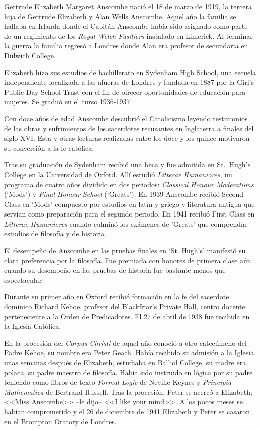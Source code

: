 Gertrude Elizabeth Margaret Anscombe nació el 18 de marzo de 1919, la tercera
hija de Gertrude Elizabeth y Alan Wells Anscombe. Aquel año la familia se
hallaba en Irlanda donde el Capitán Anscombe había sido asignado como parte de
un regimiento de los \emph{Royal Welch Fusiliers} instalado en Limerick. Al
terminar la guerra la familia regresó a Londres donde Alan era profesor de
secundaria en Dulwich College.\autocite[cf.~][p.~31]{teichman2002fellows}

Elizabeth hizo sus estudios de bachillerato en Sydenham High School, una escuela
independiente localizada a las afueras de Londres y fundada en 1887 por la
Girl's Public Day School Trust con el fin de ofrecer oportunidades de educación
para mujeres. Se graduó en el curso 1936-1937.

Con doce años de edad Anscombe descubrió el Catolicismo leyendo testimonios de
las obras y sufrimientos de los sacerdotes recusantes en Inglaterra a finales
del siglo XVI. Esta y otras lecturas realizadas entre los doce y los quince
motivaron su conversión a la fe
católica.\autocite[cf.~][p.~33]{teichman2002fellows}

Tras su graduación de Sydenham recibió una beca y fue admitida en St.~Hugh's
College en la Universidad de Oxford. Allí estudió \emph{Litterae Humaniores}, un
programa de cuatro años dividido en dos periodos: \emph{Classical Honour
  Moderations} (`Mods') y \emph{Final Honour School} (`Greats'). En 1939
Anscombe recibió Second Class en `Mods' compuesto por estudios en latín y griego
y literatura antigua que servían como preparación para el segundo periodo. En
1941 recibió First Class en \emph{Litterae Humaniores} cuando culminó los
exámenes de 'Greats' que comprendía estudios de filosofía y de historia.

El desempeño de Anscombe en las pruebas finales en `St. Hugh's' manifestó su
clara preferencia por la filosofía. Fue premiada con honores de primera clase
aún cuando su desempeño en las pruebas de historia fue bastante menos que
espectacular\autocite[p.~3~\S1]{teichmann}

Durante su primer año en Oxford recibió formación en la fe del sacerdote
dominico Richard Kehoe, profesor del Blackfriar's Private Hall, centro docente
perteneciente a la Orden de Predicadores. El 27 de abril de 1938 fue recibida en
la Iglesia Católica.

En la procesión del \emph{Corpus Christi} de aquel año conoció a otro catecúmeno
del Padre Kehoe, su nombre era Peter Geach. Había recibido su admisión a la
Iglesia unas semanas después de Elizabeth, estudiaba en Balliol College, su
madre era polaca, su padre maestro de filosofía. Había sido instruido en lógica
por su padre teniendo como libros de texto \emph{Formal Logic} de Neville Keynes
y \emph{Principia Mathematica} de Bertrand Russell. Tras la procesión, Peter se
acercó a Elizabeth; <<Miss Anscombe>> --le dijo-- <<I like your
mind>>.\autocite[cf.~][p.~187]{teichman2002fellowsxiv} A los pocos meses se
habían comprometido y el 26 de diciembre de 1941 Elizabeth y Peter se casaron en
el Brompton Oratory de Londres.\autocite[cf.~][p.~33]{teichman2002fellows}

